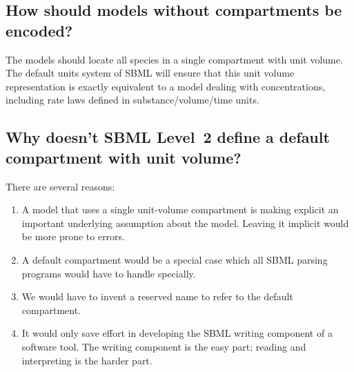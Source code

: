\documentclass{sbmlfaq}
\begin{document}
%
%
%
%
\subsection{How should models without compartments be encoded?}
\label{sec:models-without-compartments}

The models should locate all species in a single compartment with unit volume.
The default units system of SBML will ensure that this unit volume
representation is exactly equivalent to a model dealing with concentrations,
including rate laws defined in substance/volume/time units.

\subsection{Why doesn't SBML Level~2 define a default compartment with unit volume?}
\label{sec:why-no-default-compartment}

There are several reasons:
\begin{enumerate}
  
\item A model that uses a single unit-volume compartment is making explicit
  an important underlying assumption about the model.  Leaving it implicit
  would be more prone to errors.
  
\item A default compartment would be a special case which all SBML parsing
  programs would have to handle specially.
  
\item We would have to invent a reserved name to refer to the default
  compartment.
  
\item It would only save effort in developing the SBML writing component of
  a software tool.  The writing component is the easy part; reading and
  interpreting is the harder part.

\end{enumerate}
\end{document}
